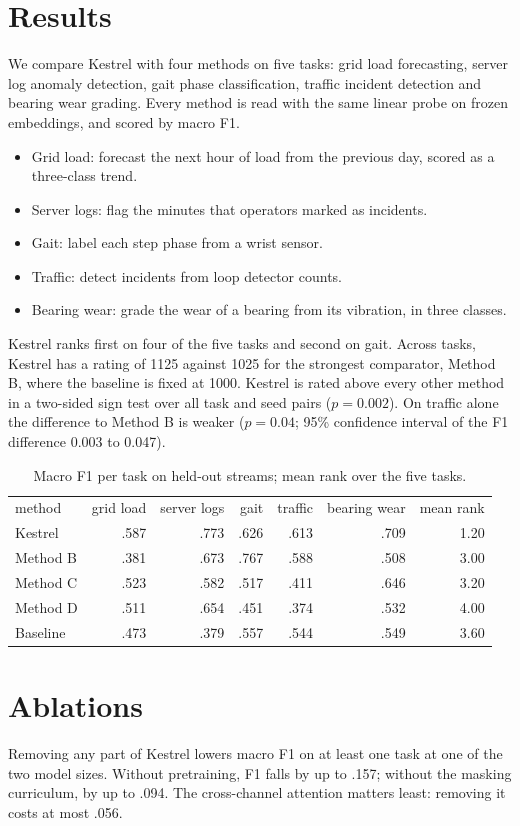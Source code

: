 \documentclass{article}
\begin{document}
\section{Results}
We compare Kestrel with four methods on five tasks: grid load forecasting, server log anomaly detection, gait phase classification, traffic incident detection and bearing wear grading.
Every method is read with the same linear probe on frozen embeddings, and scored by macro F1.
\begin{itemize}
\item Grid load: forecast the next hour of load from the previous day, scored as a three-class trend.
\item Server logs: flag the minutes that operators marked as incidents.
\item Gait: label each step phase from a wrist sensor.
\item Traffic: detect incidents from loop detector counts.
\item Bearing wear: grade the wear of a bearing from its vibration, in three classes.
\end{itemize}
Kestrel ranks first on four of the five tasks and second on gait.
Across tasks, Kestrel has a rating of 1125 against 1025 for the strongest comparator, Method B, where the baseline is fixed at 1000.
Kestrel is rated above every other method in a two-sided sign test over all task and seed pairs ($p = 0.002$).
On traffic alone the difference to Method B is weaker ($p = 0.04$; 95\% confidence interval of the F1 difference 0.003 to 0.047).

\begin{table}
\caption{Macro F1 per task on held-out streams; mean rank over the five tasks.}
\begin{tabular}{lrrrrrr}
method & grid load & server logs & gait & traffic & bearing wear & mean rank\\
Kestrel & .587 & .773 & .626 & .613 & .709 & 1.20\\
Method B & .381 & .673 & .767 & .588 & .508 & 3.00\\
Method C & .523 & .582 & .517 & .411 & .646 & 3.20\\
Method D & .511 & .654 & .451 & .374 & .532 & 4.00\\
Baseline & .473 & .379 & .557 & .544 & .549 & 3.60\\
\end{tabular}
\end{table}

\section{Ablations}
Removing any part of Kestrel lowers macro F1 on at least one task at one of the two model sizes.
Without pretraining, F1 falls by up to .157; without the masking curriculum, by up to .094.
The cross-channel attention matters least: removing it costs at most .056.
\end{document}
